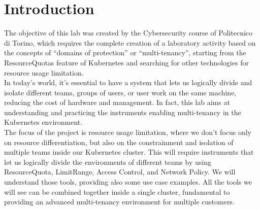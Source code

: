 \section{Introduction}
The objective of this lab was created by the Cybersecurity course of Politecnico di Torino, which requires the complete creation of a laboratory activity based on the concepts of “domains of protection” or “multi-tenancy”, starting from the ResourceQuotas feature of Kubernetes and searching for other technologies for resource usage limitation. \\
In today’s world, it's essential to have a system that lets us logically divide and isolate different teams, groups of users, or user work on the same machine, reducing the cost of hardware and management. In fact, this lab aims at understanding and practicing the instruments enabling multi-tenancy in the Kubernetes environment. \\
The focus of the project is resource usage limitation, where we don't focus only on resource differentiation, but also on the constrainment and isolation of multiple teams inside our Kubernetes cluster. This will require instruments that let us logically divide the environments of different teams by using ResourceQuota, LimitRange, Access Control, and Network Policy. We will understand those tools, providing also some use case examples. All the tools we will see can be combined together inside a single cluster, fundamental to providing an advanced multi-tenancy environment for multiple customers.